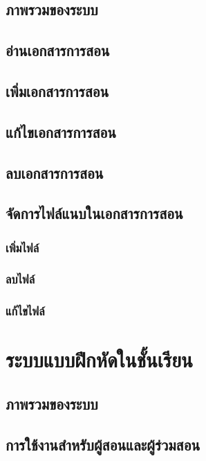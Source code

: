 \documentclass[12pt,oneside]{book}
\begin{document}
\section{ภาพรวมของระบบ}

\section{อ่านเอกสารการสอน}

\section{เพิ่มเอกสารการสอน}

\section{แก้ไขเอกสารการสอน}

\section{ลบเอกสารการสอน}

\section{จัดการไฟล์แนบในเอกสารการสอน}

\subsection{เพิ่มไฟล์}

\subsection{ลบไฟล์}

\subsection{แก้ไขไฟล์}

\chapter{ระบบแบบฝึกหัดในชั้นเรียน}

\section{ภาพรวมของระบบ}

\section{การใช้งานสำหรับผู้สอนและผู้ร่วมสอน}
\end{document}
